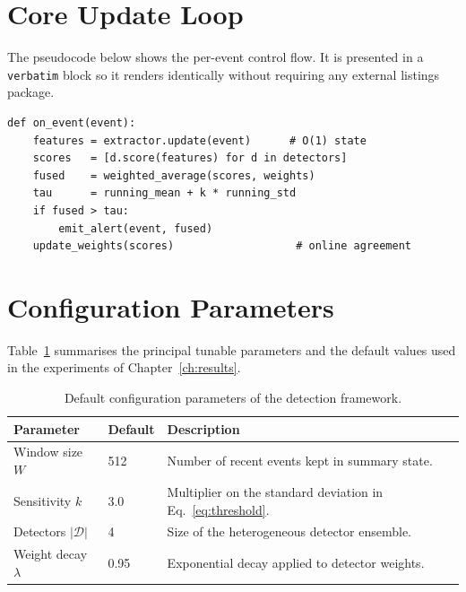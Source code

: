 \documentclass[12pt,a4paper,oneside]{report}
\begin{document}
\section{Core Update Loop}
\label{sec:impl-loop}
The pseudocode below shows the per-event control flow. It is presented in a
\texttt{verbatim} block so it renders identically without requiring any
external listings package.

\begin{verbatim}
def on_event(event):
    features = extractor.update(event)      # O(1) state
    scores   = [d.score(features) for d in detectors]
    fused    = weighted_average(scores, weights)
    tau      = running_mean + k * running_std
    if fused > tau:
        emit_alert(event, fused)
    update_weights(scores)                   # online agreement
\end{verbatim}

\section{Configuration Parameters}
\label{sec:impl-config}
Table~\ref{tab:params} summarises the principal tunable parameters and the
default values used in the experiments of Chapter~\ref{ch:results}.

\begin{table}[ht]
  \centering
  \caption{Default configuration parameters of the detection framework.}
  \label{tab:params}
  \begin{tabularx}{\textwidth}{@{}l l X@{}}
    \toprule
    \textbf{Parameter} & \textbf{Default} & \textbf{Description} \\
    \midrule
    Window size $W$        & 512   & Number of recent events kept in summary state. \\
    Sensitivity $k$        & 3.0   & Multiplier on the standard deviation in Eq.~\eqref{eq:threshold}. \\
    Detectors $|\mathcal{D}|$ & 4  & Size of the heterogeneous detector ensemble. \\
    Weight decay $\lambda$ & 0.95  & Exponential decay applied to detector weights. \\
    \bottomrule
  \end{tabularx}
\end{table}

\end{document}
